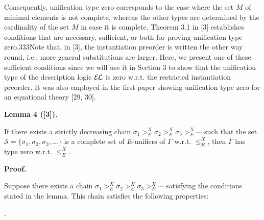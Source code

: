 
 
 
Consequently, unification type zero corresponds to the case where the set $M$ of minimal elements is not complete, whereas the other types are determined by the cardinality of the set $M$ in case it is complete. Theorem 3.1 in [3] establishes conditions that are necessary, sufficient, or both for proving unification type zero.333Note that, in [3], the instantiation preorder is written the other way round, i.e., more general substitutions are larger.  Here, we present one of these sufficient conditions since we will use it in Section 3 to show that the unification type of the description logic $\mathcal{E\mkern-1.618muL}$ is zero w.r.t. the restricted instantiation preorder. It was also employed in the first paper showing unification type zero for an equational theory [29, 30].\par
 
 
 
\par\medskip\noindent\textbf{Lemma 4 ([3]).}\par
 
 
If there exists a strictly decreasing chain $\sigma_{1}>_{E}^{X}\sigma_{2}>_{E}^{X}\sigma_{3}>_{E}^{X}\cdots$ such that the set $\mathcal{S}=\{\sigma_{1},\sigma_{2},\sigma_{3},\ldots\}$ is a complete set of $E$-unifiers of $\Gamma$ w.r.t. $\leq_{E}^{X}$, then $\Gamma$ has type zero w.r.t. $\leq_{E}^{X}$.\par
 
 
 
 
\par\medskip\noindent\textbf{Proof.}\par
 
 
Suppose there exists a chain $\sigma_{1}>_{E}^{X}\sigma_{2}>_{E}^{X}\sigma_{3}>_{E}^{X}\cdots$ satisfying the conditions stated in the lemma. This chain satisfies the following properties:\par
  
\par{}. 
 
